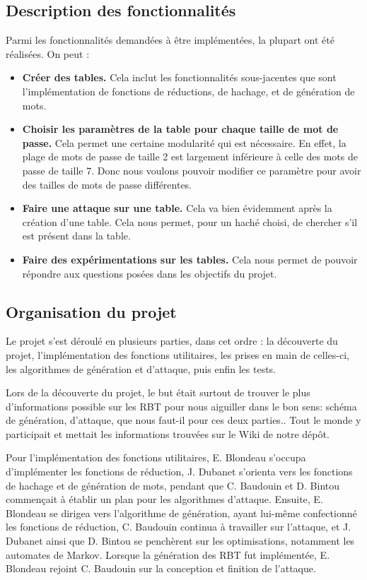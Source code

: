 \documentclass[french,12pt]{article}
\begin{document}
    \subsection{Description des fonctionnalités}
    Parmi les fonctionnalités demandées à être implémentées, la plupart ont été réalisées.
    On peut :
    \begin{itemize}
        \item \textbf{Créer des tables.} Cela inclut les fonctionnalités sous-jacentes que sont l'implémentation de fonctions de réductions, de hachage, et de génération de mots.
        \item \textbf{Choisir les paramètres de la table pour chaque taille de mot de passe. } Cela permet une certaine modularité qui est nécessaire. En effet, la plage de mots de passe de taille 2 est largement inférieure à celle des mots de passe de taille 7. Donc nous voulons pouvoir modifier ce paramètre pour avoir des tailles de mots de passe différentes.
        \item \textbf{Faire une attaque sur une table. } Cela va bien évidemment après la création d'une table. Cela nous permet, pour un haché choisi, de chercher s'il est présent dans la table.
        \item \textbf{Faire des expérimentations sur les tables. }Cela nous permet de pouvoir répondre aux questions posées dans les objectifs du projet.
    \end{itemize} 
    \subsection{Organisation du projet}
    Le projet s'est déroulé en plusieurs parties, dans cet ordre : la découverte du projet, l'implémentation des fonctions utilitaires, les prises en main de celles-ci, les algorithmes de génération et d'attaque, puis enfin les tests.

    Lors de la découverte du projet, le but était surtout de trouver le plus d'informations possible sur les RBT pour nous aiguiller dans le bon sens: schéma de génération, d'attaque, que nous faut-il pour ces deux parties.. Tout le monde y participait et mettait les informations trouvées sur le Wiki de notre dépôt.

    Pour l'implémentation des fonctions utilitaires, E. Blondeau s'occupa d'implémenter les fonctions de réduction, J. Dubanet s'orienta vers les fonctions de hachage et de génération de mots, pendant que C. Baudouin et D. Bintou commençait à établir un plan pour les algorithmes d'attaque. 
    Ensuite, E. Blondeau se dirigea vers l'algorithme de génération, ayant lui-même confectionné les fonctions de réduction, C. Baudouin continua à travailler sur l'attaque, et J. Dubanet ainsi que D. Bintou se penchèrent sur les optimisations, notamment les automates de Markov. Lorsque la génération des RBT fut implémentée, E. Blondeau rejoint C. Baudouin sur la conception et finition de l'attaque.
\end{document}
